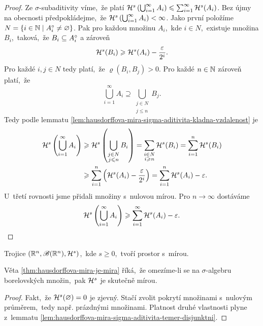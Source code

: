 \begin{proof}
    Ze $\sigma$-subaditivity víme,~že platí $\mathcal{H}^{s}\left(\bigcup_{i=1}^\infty A_i\right)\leqslant\sum_{i=1}^{\infty}\mathcal{H}^{s}(A_i)$. Bez újmy na obecnosti předpokládejme,~že $\mathcal{H}^{s}\left(\bigcup_{i=1}^\infty A_i\right)<\infty$. Jako první položíme $N=\left\{i\in\mathbb{N}\mid A_i^\circ\neq\varnothing\right\}$. Pak pro každou množinu $A_i$,~kde $i\in N$,~existuje množina $B_i$,~taková,~že $B_i\subseteq A_i^\circ$ a zároveň
    \[\mathcal{H}^{s}(B_i)\geqslant\mathcal{H}^{s}(A_i)-\dfrac{\varepsilon}{2^i}.\]
    Pro každé $i,j\in N$ tedy platí,~že $\varrho(B_i,B_j)>0$. Pro každé $n\in\mathbb{N}$ zároveň platí,~že
    \[\bigcup_{i=1}^\infty A_i\supseteq\bigcup_{\substack{j\in N\\j\leqslant n}}B_j.\]
    Tedy podle lemmatu \ref{lem:hausdorffova-mira-sigma-aditivita-kladna-vzdalenost} je
    \begin{align*}
        \mathcal{H}^{s}\left(\bigcup_{i=1}^\infty A_i\right)&\geqslant\mathcal{H}^{s}\left(\bigcup_{\substack{j\in N\\j\leqslant n}}B_i\right)=\sum_{\substack{i\in N\\i\geqslant n}}\mathcal{H}^{s}(B_i)=\sum_{i=1}^{n}\mathcal{H}^{s}(B_i)\\
        &\geqslant\sum_{i=1}^{n}\left(\mathcal{H}^{s}(A_i)-\dfrac{\varepsilon}{2^i}\right)=\sum_{i=1}^{n}\mathcal{H}^{s}(A_i)-\varepsilon.
    \end{align*}
    U~třetí rovnosti jsme přidali množiny s~nulovou mírou. Pro $n\to\infty$ dostáváme
    \[\mathcal{H}^{s}\left(\bigcup_{i=1}^\infty A_i\right)\geqslant\sum_{i=1}^{\infty}\mathcal{H}^{s}(A_i)-\varepsilon.\]
\end{proof}
\begin{theorem}\label{thm:hausdorffova-mira-je-mira}
    Trojice $(\mathbb{R}^n,\mathscr{B}(\mathbb{R}^n),\mathcal{H}^{s})$,~kde $s\geqslant 0$,~tvoří prostor s~mírou.
\end{theorem}
Věta \ref{thm:hausdorffova-mira-je-mira} říká,~že omezíme-li se na $\sigma$-algebru borelovských množin,~pak $\mathcal{H}^{s}$ je skutečně mírou.
\begin{proof}
    Fakt,~že $\mathcal{H}^{s}(\varnothing)=0$ je zjevný. Stačí zvolit pokrytí množinami s~nulovým průměrem,~tedy např. prázdnými množinami. Platnost druhé vlastnosti plyne z~lemmatu \ref{lem:hausdorffova-mira-sigma-aditivita-temer-disjunktni}.
\end{proof}

